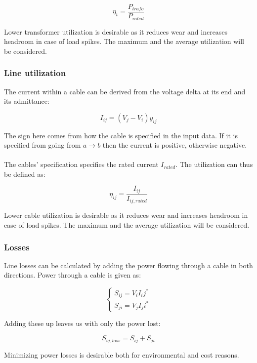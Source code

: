 \begin{equation}
  \eta_t = \frac{P_{trafo}}{P_{rated}}
\end{equation}

Lower transformer utilization is desirable as it reduces wear and increases
headroom in case of load spikes. The maximum and the average utilization
will be considered.

\subsubsection{Line utilization}

The current within a cable can be derived from the voltage delta at its
end and its admittance:

\begin{equation}
  I_{ij} = (V_j - V_i)y_{ij}
\end{equation}

The sign here comes from how the cable is specified in the input data. If it is
specified from going from $a \to b$ then the current is positive, otherwise negative.\\
\\
The cables' specification specifies the rated current $I_{rated}$. The utilization
can thus be defined as:

\begin{equation}
  \eta_{ij} = \frac{I_{ij}}{I_{ij, rated}}
  \label{eq:measures:cable_utilization}
\end{equation}

Lower cable utilization is desirable as it reduces wear and increases
headroom in case of load spikes. The maximum and the average utilization
will be considered.

\subsubsection{Losses}

Line losses can be calculated by adding the power flowing through
a cable in both directions. Power through a cable is given as:

\begin{equation}
  \begin{cases}
  S_{ij} = V_i I_ij^*\\
  S_{ji} = V_j I_ji^*
  \end{cases}
\end{equation}

Adding these up leaves us with only the power lost:

\begin{equation}
S_{ij, loss} = S_{ij} + S_{ji}
\end{equation}

Minimizing power losses is desirable both for environmental and cost reasons.